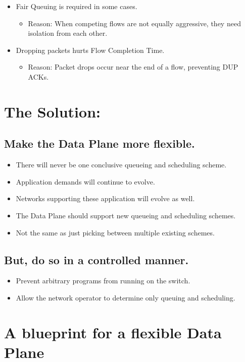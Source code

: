 {\begin{multicols}{2}
\begin{itemize}
\item Fair Queuing is required in some cases.
      \begin{itemize}      
      \item Reason: When competing flows are not equally aggressive, they need isolation from each other.
      \end{itemize}

\item Dropping packets hurts Flow Completion Time.
      \begin{itemize}
      \item Reason: Packet drops occur near the end of a flow, preventing DUP ACKs.
      \end{itemize}

\end{itemize}

%
\section*{The Solution:}
\subsection*{Make the Data Plane more flexible.}
\begin{itemize}
\item There will never be one conclusive queueing and scheduling scheme.
\item Application demands will continue to evolve.
\item Networks supporting these application will evolve as well.
\item The Data Plane should support new queueing and scheduling schemes.
\item Not the same as just picking between multiple existing schemes.
\end{itemize}

\subsection*{But, do so in a controlled manner.}
\begin{itemize}
\item Prevent arbitrary programs from running on the switch.
\item Allow the network operator to determine only queuing and scheduling.
\end{itemize}

\section*{A blueprint for a flexible Data Plane}


\end{multicols}}
